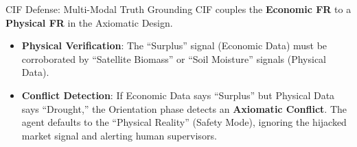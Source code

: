 \documentclass[
  ignorenonframetext,
]{beamer}
\providecommand{\tightlist}{%
  \setlength{\itemsep}{0pt}\setlength{\parskip}{0pt}}
\begin{document}
\begin{frame}{CIF Defense: Multi-Modal Truth Grounding}
\protect{}\label{cif-defense-multi-modal-truth-grounding}
CIF couples the \textbf{Economic FR} to a \textbf{Physical FR} in the
Axiomatic Design.

\begin{itemize}
\tightlist
\item
  \textbf{Physical Verification}: The ``Surplus'' signal (Economic Data)
  must be corroborated by ``Satellite Biomass'' or ``Soil Moisture''
  signals (Physical Data).
\item
  \textbf{Conflict Detection}: If Economic Data says ``Surplus'' but
  Physical Data says ``Drought,'' the Orientation phase detects an
  \textbf{Axiomatic Conflict}. The agent defaults to the ``Physical
  Reality'' (Safety Mode), ignoring the hijacked market signal and
  alerting human supervisors.
\end{itemize}
\end{frame}
\end{document}
